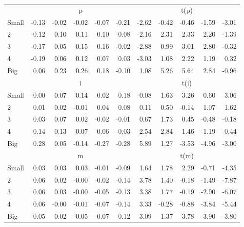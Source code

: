 \begin{table}[!ht]
\begin{tabular}{lrrrrrrrrrr}
      & \multicolumn{5}{c}{p} & \multicolumn{5}{c}{t(p)}
    
    \\
      \cmidrule(r){2-6} \cmidrule(r){7-11}

    Small   & -0.13  & -0.02  & -0.02  & -0.07  & -0.21  & -2.62  & -0.42  & -0.46  & -1.59  & -3.01  \\
         2  & -0.12  & 0.10  & 0.11  & 0.10  & -0.08  & -2.16  & 2.31  & 2.33  & 2.20  & -1.39  \\
         3  & -0.17  & 0.05  & 0.15  & 0.16  & -0.02  & -2.88  & 0.99  & 3.01  & 2.80  & -0.32  \\
         4  & -0.19  & 0.06  & 0.12  & 0.07  & 0.03  & -3.03  & 1.08  & 2.22  & 1.19  & 0.32  \\
    Big     & 0.06  & 0.23  & 0.26  & 0.18  & -0.10  & 1.08  & 5.26  & 5.64  & 2.84  & -0.96  \\

  
    
      & \multicolumn{5}{c}{i} & \multicolumn{5}{c}{t(i)}
    
    \\
      \cmidrule(r){2-6} \cmidrule(r){7-11}

    Small   & -0.00  & 0.07  & 0.14  & 0.02  & 0.18  & -0.08  & 1.63  & 3.26  & 0.60  & 3.06  \\
         2  & 0.01  & 0.02  & -0.01  & 0.04  & 0.08  & 0.11  & 0.50  & -0.14  & 1.07  & 1.62  \\
         3  & 0.03  & 0.07  & 0.02  & -0.02  & -0.01  & 0.67  & 1.73  & 0.45  & -0.48  & -0.18  \\
         4  & 0.14  & 0.13  & 0.07  & -0.06  & -0.03  & 2.54  & 2.84  & 1.46  & -1.19  & -0.44  \\
    Big     & 0.28  & 0.05  & -0.14  & -0.27  & -0.28  & 5.89  & 1.27  & -3.53  & -4.96  & -3.00  \\

  
    
      & \multicolumn{5}{c}{m} & \multicolumn{5}{c}{t(m)}
    
    \\
      \cmidrule(r){2-6} \cmidrule(r){7-11}

    Small   & 0.03  & 0.03  & 0.03  & -0.01  & -0.09  & 1.64  & 1.78  & 2.29  & -0.71  & -4.35  \\
         2  & 0.06  & 0.02  & -0.00  & -0.02  & -0.14  & 3.78  & 1.40  & -0.18  & -1.49  & -7.87  \\
         3  & 0.06  & 0.03  & -0.00  & -0.05  & -0.13  & 3.38  & 1.77  & -0.19  & -2.90  & -6.07  \\
         4  & 0.06  & -0.00  & -0.01  & -0.07  & -0.14  & 3.33  & -0.28  & -0.88  & -3.84  & -5.44  \\
    Big     & 0.05  & 0.02  & -0.05  & -0.07  & -0.12  & 3.09  & 1.37  & -3.78  & -3.90  & -3.80  \\

  

  \bottomrule
\end{tabular}
\label{tbl:25_Size_Beta_F17}
\end{table}